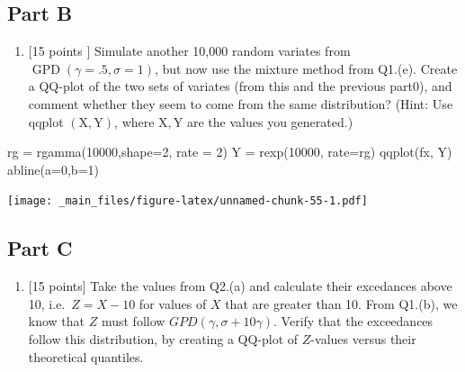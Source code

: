 \documentclass[
  oneside]{book}
\newenvironment{Shaded}{\begin{snugshade}}{\end{snugshade}}
\newcommand{\AttributeTok}[1]{\textcolor[rgb]{0.77,0.63,0.00}{#1}}
\newcommand{\DecValTok}[1]{\textcolor[rgb]{0.00,0.00,0.81}{#1}}
\newcommand{\FunctionTok}[1]{\textcolor[rgb]{0.00,0.00,0.00}{#1}}
\newcommand{\NormalTok}[1]{#1}
\newcommand{\OtherTok}[1]{\textcolor[rgb]{0.56,0.35,0.01}{#1}}
\providecommand{\tightlist}{%
  \setlength{\itemsep}{0pt}\setlength{\parskip}{0pt}}
\begin{document}
\hypertarget{part-b-13}{%
\subsection{Part B}\label{part-b-13}}

\begin{enumerate}
\def\labelenumi{(\alph{enumi})}
\setcounter{enumi}{1}
\tightlist
\item
  {[}15 points \(]\) Simulate another 10,000 random variates from \(\operatorname{GPD}(\gamma=.5, \sigma=1)\), but now use the mixture method from Q1.(e). Create a QQ-plot of the two sets of variates (from this and the previous part0), and comment whether they seem to come from the same distribution?
  (Hint: Use qqplot \((\mathrm{X}, \mathrm{Y})\), where \(\mathrm{X}, \mathrm{Y}\) are the values you generated.)
\end{enumerate}

\begin{Shaded}
\begin{Highlighting}[]
\NormalTok{rg }\OtherTok{=} \FunctionTok{rgamma}\NormalTok{(}\DecValTok{10000}\NormalTok{,}\AttributeTok{shape=}\DecValTok{2}\NormalTok{, }\AttributeTok{rate =} \DecValTok{2}\NormalTok{)}
\NormalTok{Y }\OtherTok{=} \FunctionTok{rexp}\NormalTok{(}\DecValTok{10000}\NormalTok{, }\AttributeTok{rate=}\NormalTok{rg)}
\FunctionTok{qqplot}\NormalTok{(fx, Y)}
\FunctionTok{abline}\NormalTok{(}\AttributeTok{a=}\DecValTok{0}\NormalTok{,}\AttributeTok{b=}\DecValTok{1}\NormalTok{)}
\end{Highlighting}
\end{Shaded}

\texttt{[image: \_main\_files/figure-latex/unnamed-chunk-55-1.pdf]}

\hypertarget{part-c-6}{%
\subsection{Part C}\label{part-c-6}}

\begin{enumerate}
\def\labelenumi{(\alph{enumi})}
\setcounter{enumi}{2}
\tightlist
\item
  {[}15 points{]} Take the values from Q2.(a) and calculate their excedances above 10, i.e.~\(Z=X-10\) for values of \(X\) that are greater than 10. From Q1.(b), we know that \(Z\) must follow \(G P D(\gamma, \sigma+10 \gamma)\). Verify that the exceedances follow this distribution, by creating a QQ-plot of \(Z\)-values versus their theoretical quantiles.
\end{enumerate}
\end{document}
